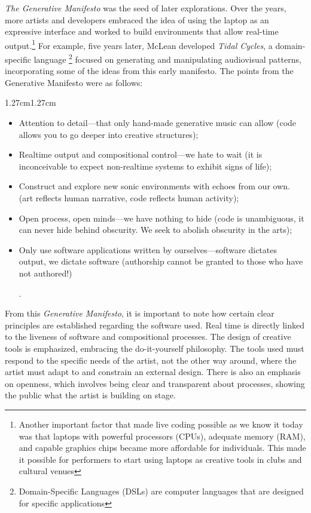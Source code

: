 \documentclass[12pt, twoside, a4paper]{report}
\begin{document}
\textit{The Generative Manifesto} was the seed of later explorations. Over the years, more artists and developers embraced the idea of using the laptop as an expressive interface and worked to build environments that allow real-time output.\footnote{Another important factor that made live coding possible as we know it today was that laptops with powerful processors (CPUs), adequate memory (RAM), and capable graphics chips became more affordable for individuals. This made it possible for performers to start using laptops as creative tools in clubs and cultural venues} For example, five years later, McLean developed \textit{Tidal Cycles}, a domain-specific language \footnote{Domain-Specific Languages (DSLs) are computer languages that are designed for specific applications} focused on generating and manipulating audiovisual patterns, incorporating some of the ideas from this early manifesto. The points from the Generative Manifesto were as follows:

\begin{adjustwidth}{1.27cm}{1.27cm}
\begin{itemize}
   \renewcommand{\labelitemi}{--}
  \item  Attention to detail—that only hand-made generative music can allow (code allows you to go deeper into creative structures);
 \item Realtime output and compositional control—we hate to wait (it is inconceivable to expect non-realtime systems to exhibit signs of life);
  \item  Construct and explore new sonic environments with echoes from our own. (art reflects human narrative, code reflects human activity);
\item Open process, open minds—we have nothing to hide (code is unambiguous, it can never hide behind obscurity. We seek to abolish obscurity in the arts);
\item  Only use software applications written by ourselves—software dictates output, we dictate software (authorship cannot be granted to those who have not authored!)

\citep{generativeManifesto}.
\end{itemize}

\end{adjustwidth}


From this \textit{Generative Manifesto}, it is important to note how certain clear principles are established regarding the software used. Real time is directly linked to the liveness of software and compositional processes. The design of creative tools is emphasized, embracing the do-it-yourself philosophy. The tools used must respond to the specific needs of the artist, not the other way around, where the artist must adapt to and constrain an external design. There is also an emphasis on openness, which involves being clear and transparent about processes, showing the public what the artist is building on stage.
\end{document}
